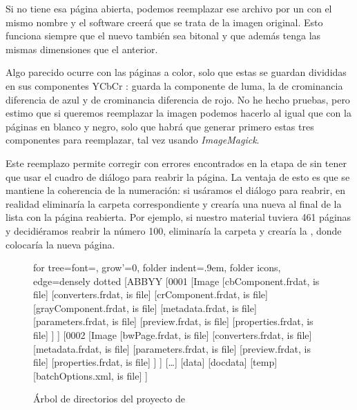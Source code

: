 \documentclass[%
	a5paper,
	10pt,
	twoside,
	openright,
	final,
]{memoir}
\begin{document}
{	Si \abbyy no tiene esa página abierta, podemos reemplazar ese archivo por un \tiff con el mismo nombre y el software creerá que se trata de la imagen original. Esto funciona siempre que el nuevo \tiff también sea bitonal y que además tenga las mismas dimensiones que el anterior.

	Algo parecido ocurre con las páginas a color, solo que estas se guardan divididas en sus componentes YCbCr \cite{YCbCr}:  guarda la componente de luma,  la de crominancia diferencia de azul y  de crominancia diferencia de rojo. No he hecho pruebas, pero estimo que si queremos reemplazar la imagen podemos hacerlo al igual que con la páginas en blanco y negro, solo que habrá que generar primero estas tres componentes para reemplazar, tal vez usando \emph{ImageMagick}.

	Este reemplazo permite corregir con \scantailor errores encontrados en la etapa de \ocr sin tener que usar el cuadro de diálogo para reabrir la página. La ventaja de esto es que se mantiene la coherencia de la numeración: si usáramos el diálogo para reabrir, \abbyy en realidad eliminaría la carpeta correspondiente y crearía una nueva al final de la lista con la página reabierta. Por ejemplo, si nuestro material tuviera 461 páginas y decidiéramos reabrir la número 100, \abbyy eliminaría la carpeta  y crearía la , donde colocaría la nueva página.

	\begin{figure}
		\vspace{-\onelineskip}
		\begin{forest}
			for tree={font=\sffamily, grow'=0,
				folder indent=.9em, folder icons,
				edge=densely dotted}
			[ABBYY
			[0001
			[Image
				[cbComponent.frdat, is file]
				[converters.frdat, is file]
				[crComponent.frdat, is file]
				[grayComponent.frdat, is file]
				[metadata.frdat, is file]
				[parameters.frdat, is file]
				[preview.frdat, is file]
				[properties.frdat, is file]
			]
			]
			[0002
			[Image
				[bwPage.frdat, is file]
				[converters.frdat, is file]
				[metadata.frdat, is file]
				[parameters.frdat, is file]
				[preview.frdat, is file]
				[properties.frdat, is file]
			]
			]
			[\dots]
			[data]
			[docdata]
			[temp]
			[batchOptions.xml, is file]
			]
		\end{forest}
		\caption{Árbol de directorios del proyecto de \abbyy\label{fig:abbyyProjectStructure}}
	\end{figure}

}
\end{document}
